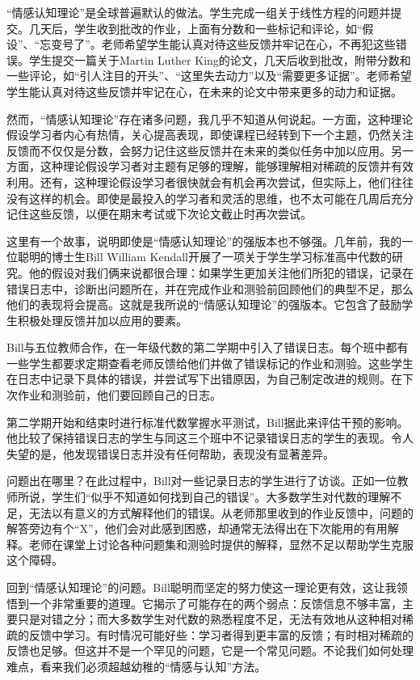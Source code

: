 “情感认知理论”是全球普遍默认的做法。学生完成一组关于线性方程的问题并提交。几天后，学生收到批改的作业，上面有分数和一些标记和评论，如“假设”、“忘变号了”。老师希望学生能认真对待这些反馈并牢记在心，不再犯这些错误。学生提交一篇关于Martin Luther King的论文，几天后收到批改，附带分数和一些评论，如“引人注目的开头”、“这里失去动力”以及“需要更多证据”。老师希望学生能认真对待这些反馈并牢记在心，在未来的论文中带来更多的动力和证据。

然而，“情感认知理论”存在诸多问题，我几乎不知道从何说起。一方面，这种理论假设学习者内心有热情，关心提高表现，即使课程已经转到下一个主题，仍然关注反馈而不仅仅是分数，会努力记住这些反馈并在未来的类似任务中加以应用。另一方面，这种理论假设学习者对主题有足够的理解，能够理解相对稀疏的反馈并有效利用。还有，这种理论假设学习者很快就会有机会再次尝试，但实际上，他们往往没有这样的机会。即使是最投入的学习者和灵活的思维，也不太可能在几周后充分记住这些反馈，以便在期末考试或下次论文截止时再次尝试。

这里有一个故事，说明即使是“情感认知理论”的强版本也不够强。几年前，我的一位聪明的博士生Bill William Kendall开展了一项关于学生学习标准高中代数的研究。他的假设对我们俩来说都很合理：如果学生更加关注他们所犯的错误，记录在错误日志中，诊断出问题所在，并在完成作业和测验前回顾他们的典型不足，那么他们的表现将会提高。这就是我所说的“情感认知理论”的强版本。它包含了鼓励学生积极处理反馈并加以应用的要素。

Bill与五位教师合作，在一年级代数的第二学期中引入了错误日志。每个班中都有一些学生都要求定期查看老师反馈给他们并做了错误标记的作业和测验。这些学生在日志中记录下具体的错误，并尝试写下出错原因，为自己制定改进的规则。在下次作业和测验前，他们要回顾自己的日志。

第二学期开始和结束时进行标准代数掌握水平测试，Bill据此来评估干预的影响。他比较了保持错误日志的学生与同这三个班中不记录错误日志的学生的表现。令人失望的是，他发现错误日志并没有任何帮助，表现没有显著差异。

问题出在哪里？在此过程中，Bill对一些记录日志的学生进行了访谈。正如一位教师所说，学生们“似乎不知道如何找到自己的错误”。大多数学生对代数的理解不足，无法以有意义的方式解释他们的错误。从老师那里收到的作业反馈中，问题的解答旁边有个“X”，他们会对此感到困惑，却通常无法得出在下次能用的有用解释。老师在课堂上讨论各种问题集和测验时提供的解释，显然不足以帮助学生克服这个障碍。

回到“情感认知理论”的问题。Bill聪明而坚定的努力使这一理论更有效，这让我领悟到一个非常重要的道理。它揭示了可能存在的两个弱点：反馈信息不够丰富，主要只是对错之分；而大多数学生对代数的熟悉程度不足，无法有效地从这种相对稀疏的反馈中学习。有时情况可能好些：学习者得到更丰富的反馈；有时相对稀疏的反馈也足够。但这并不是一个罕见的问题，它是一个常见问题。不论我们如何处理难点，看来我们必须超越幼稚的“情感与认知”方法。

